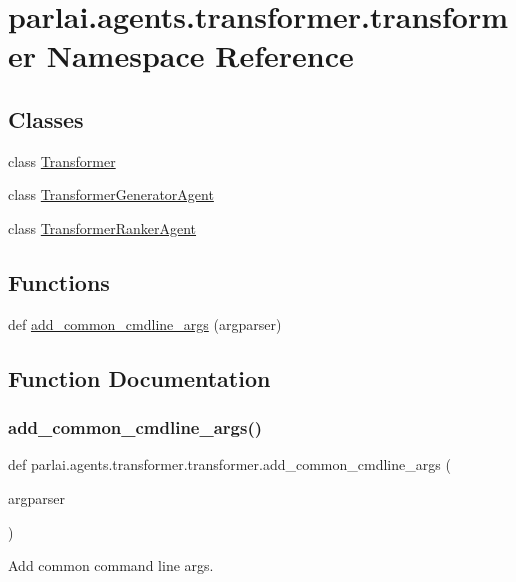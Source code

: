 \hypertarget{namespaceparlai_1_1agents_1_1transformer_1_1transformer}{}\section{parlai.\+agents.\+transformer.\+transformer Namespace Reference}
\label{namespaceparlai_1_1agents_1_1transformer_1_1transformer}
\subsection*{Classes}
\begin{DoxyCompactItemize}
\item 
class \hyperlink{classparlai_1_1agents_1_1transformer_1_1transformer_1_1Transformer}{Transformer}
\item 
class \hyperlink{classparlai_1_1agents_1_1transformer_1_1transformer_1_1TransformerGeneratorAgent}{Transformer\+Generator\+Agent}
\item 
class \hyperlink{classparlai_1_1agents_1_1transformer_1_1transformer_1_1TransformerRankerAgent}{Transformer\+Ranker\+Agent}
\end{DoxyCompactItemize}
\subsection*{Functions}
\begin{DoxyCompactItemize}
\item 
def \hyperlink{namespaceparlai_1_1agents_1_1transformer_1_1transformer_a916bc49d43dc0e244d24c47956c621ca}{add\+\_\+common\+\_\+cmdline\+\_\+args} (argparser)
\end{DoxyCompactItemize}


\subsection{Function Documentation}
\mbox{\label{namespaceparlai_1_1agents_1_1transformer_1_1transformer_a916bc49d43dc0e244d24c47956c621ca}} 
\subsubsection{\texorpdfstring{add\+\_\+common\+\_\+cmdline\+\_\+args()}{add\_common\_cmdline\_args()}}
{\footnotesize\ttfamily def parlai.\+agents.\+transformer.\+transformer.\+add\+\_\+common\+\_\+cmdline\+\_\+args (\begin{DoxyParamCaption}\item[{}]{argparser }\end{DoxyParamCaption})}

\begin{DoxyVerb}Add common command line args.
\end{DoxyVerb}
 